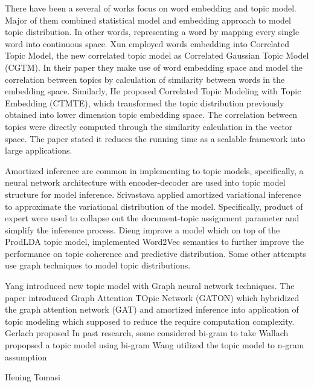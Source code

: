 There have been a several of works focus on word embedding and topic model. Major of them combined statistical model and embedding approach to model topic distribution. In other words, representing a word by mapping every single word into continuous space.
Xun \cite{xun_correlated_2017} employed words embedding into Correlated Topic Model, the new correlated topic model as Correlated Gaussian Topic Model (CGTM). In their paper they make use of word embedding space and model the correlation between topics by calculation of similarity between words in the embedding space.
Similarly, He\cite{he_efficient_2017} proposed Correlated Topic Modeling with Topic Embedding (CTMTE), which transformed the topic distribution previously obtained into lower dimension topic embedding space. The correlation between topics were directly computed through the similarity calculation in the vector space. The paper stated it reduces the running time as a scalable framework into large applications.

Amortized inference\cite{kingma_auto-encoding_2014} are common in implementing to topic models, specifically, a neural network architecture with encoder-decoder are used into topic model structure for model inference.
Srivastava\cite{srivastava_autoencoding_2017} applied amortized variational inference to approximate the variational distribution of the model. Specifically, product of expert were used to collapse out the document-topic assignment parameter and simplify the inference process.
Dieng\cite{dieng_topic_2019} improve a model which on top of the ProdLDA topic model, implemented Word2Vec semantics to further improve the performance on topic coherence and predictive distribution.
Some other attempts use graph techniques to model topic distributions.

Yang\cite{yang_graph_2020} introduced new topic model with Graph neural network techniques. The paper introduced Graph Attention TOpic Network (GATON) which hybridized the graph attention network (GAT) and amortized inference into application of topic modeling which supposed to reduce the require computation complexity.
Gerlach\cite{gerlach_network_2018} proposed
In past research, some considered bi-gram to take 
Wallach propopsed a topic model using bi-gram \cite{wallach_topic_2006}
Wang \cite{wang_topical_2007} utilized the topic model to n-gram assumption

Hening\cite{hennig_kernel_2012}
Tomasi\cite{tomasi_stochastic_nodate}
